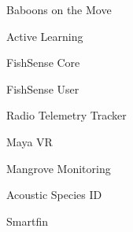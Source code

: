 \item Baboons on the Move
\item Active Learning
\item FishSense Core
\item FishSense User
\item Radio Telemetry Tracker
\item Maya VR
\item Mangrove Monitoring
\item Acoustic Species ID
\item Smartfin
